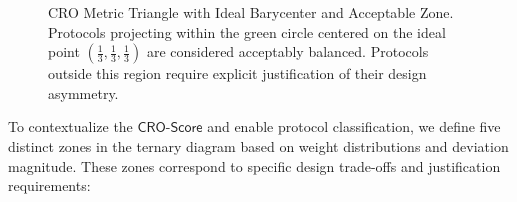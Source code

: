 \documentclass[preprint,12pt]{elsarticle}
\begin{document}
\begin{figure}[ht]
                \caption{CRO Metric Triangle with Ideal Barycenter and Acceptable Zone. Protocols projecting within the green circle centered on the ideal point $\left(\tfrac{1}{3}, \tfrac{1}{3}, \tfrac{1}{3}\right)$ are considered acceptably balanced. Protocols outside this region require explicit justification of their design asymmetry.}
                \label{fig:cro_zones}
            \end{figure}

            To contextualize the $\mathsf{CRO\text{-}Score}$ and enable protocol classification, we define five distinct zones in the ternary diagram based on weight distributions and deviation magnitude. These zones correspond to specific design trade-offs and justification requirements:
\end{document}
